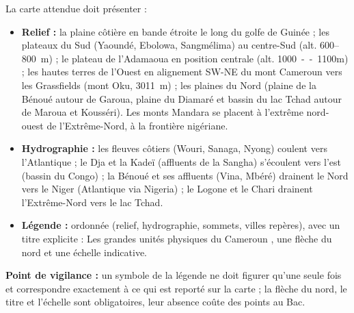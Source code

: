 \documentclass[11pt]{article}
\begin{document}
\begin{corrige}
La carte attendue doit présenter :
\begin{itemize}
\item \textbf{Relief :} la plaine côtière en bande étroite le long du golfe de Guinée ; les plateaux du Sud (Yaoundé, Ebolowa, Sangmélima) au centre-Sud (alt. 600--\SI{800}{m}) ; le plateau de l'Adamaoua en position centrale (alt. \SI{1000}{--1100}{m}) ; les hautes terres de l'Ouest en alignement SW-NE du mont Cameroun vers les Grassfields (mont Oku, \SI{3011}{m}) ; les plaines du Nord (plaine de la Bénoué autour de Garoua, plaine du Diamaré et bassin du lac Tchad autour de Maroua et Kousséri). Les monts Mandara se placent à l'extrême nord-ouest de l'Extrême-Nord, à la frontière nigériane.
\item \textbf{Hydrographie :} les fleuves côtiers (Wouri, Sanaga, Nyong) coulent vers l'Atlantique ; le Dja et la Kadeï (affluents de la Sangha) s'écoulent vers l'est (bassin du Congo) ; la Bénoué et ses affluents (Vina, Mbéré) drainent le Nord vers le Niger (Atlantique via Nigeria) ; le Logone et le Chari drainent l'Extrême-Nord vers le lac Tchad.
\item \textbf{Légende :} ordonnée (relief, hydrographie, sommets, villes repères), avec un titre explicite : \og Les grandes unités physiques du Cameroun \fg, une flèche du nord et une échelle indicative.
\end{itemize}
\textbf{Point de vigilance :} un symbole de la légende ne doit figurer qu'une seule fois et correspondre exactement à ce qui est reporté sur la carte ; la flèche du nord, le titre et l'échelle sont obligatoires, leur absence coûte des points au Bac.
\end{corrige}
\end{document}
